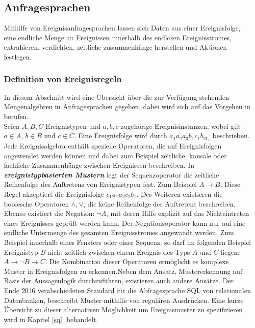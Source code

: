 \documentclass{acm_proc_article-sp}
\begin{document}
%
%
\subsection{Anfragesprachen}\label{kap:anfragesprachen}
\vspace{0.1cm}
Mithilfe von Ereignisanfragesprachen lassen sich Daten aus einer Ereignisfolge, eine 
endliche Menge an Ereignissen innerhalb des endlosen Ereignisstromes, extrahieren, 
verdichten, zeitliche zusammenhänge herstellen und Aktionen festlegen.

\subsubsection{Definition von Ereignisregeln}\label{kap:ereignisregeln}
\vspace{0.1cm}
In diesem Abschnitt wird eine Übersicht über die zur Verfügung stehenden Mengenalgebren 
in Anfragesprachen gegeben, dabei wird sich auf das Vorgehen in \cite{bruns} berufen.\\
Seien $A,B,C$ Ereignistypen und $a,b,c$ zugehörige Ereignisinstanzen, wobei gilt 
$a \in A$, $b \in B$ und $c \in C$. Eine Ereignisfolge wird durch $a_1a_2a_3b_1c_1b_21_4$
beschrieben.\\
Jede Ereignisalgebra enthält spezielle Operatoren, die auf Ereignisfolgen angewendet 
werden können und dabei zum Beispiel zeitliche, kausale oder fachliche Zusammenhänge 
zwischen 
Ereignissen beschreiben. In \textbf{\textit{ereignistypbasierten Mustern}} legt der 
Sequenzoperator die zeitliche Reihenfolge des Auftretens von Ereignistypen fest. Zum 
Beispiel $A \rightarrow B$. Diese Regel akzeptiert die Ereignisfolge $c_1a_1a_2c_2b_1$. 
Des Weiteren existieren die boolesche Operatoren $\land , \lor$, die keine Reihenfolge 
des Auftretens beschreiben. Ebenso existiert die Negation: $\neg A$, mit deren Hilfe 
explizit auf das Nichteintreten eines Ereignisses geprüft werden kann. Der 
Negationsoperator kann nur auf eine endliche Untermenge des gesamten Ereignisstromes 
angewandt werden. Zum Beispiel innerhalb eines Fensters oder einer Sequenz, so darf im 
folgenden Beispiel Ereignistyp $B$ nicht zeitlich zwischen einem Ereignis des Typs $A$ 
und $C$ liegen: $A\rightarrow\lnot B\rightarrow C$. 
Die Kombination dieser Operatoren ermöglicht es komplexe Muster in Ereignisfolgen zu 
erkennen.Neben dem Ansatz, Mustererkennung auf Basis der Aussagenlogik durchzuführen, 
existieren auch andere Ansätze. Der Ende 2016 verabschiedeten Standard \cite{sql-2016} 
für die Abfragesprache SQL von relationalen Datenbanken, beschreibt Muster mithilfe von 
regulären Ausdrücken. Eine kurze Übersicht zu dieser alternativen Möglichkeit um 
Ereignismuster zu spezifizieren wird in Kapitel \ref{sql} behandelt.
\end{document}
